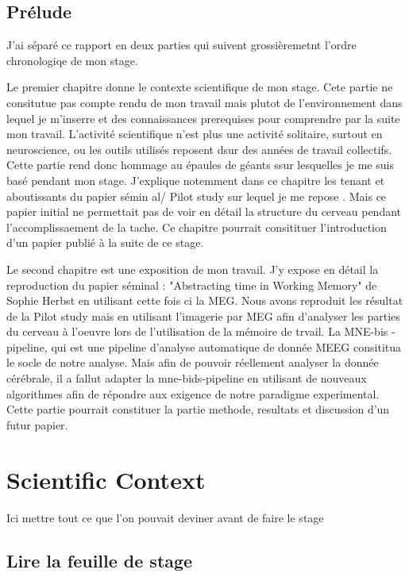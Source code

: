 \section{Prélude}

J'ai séparé ce rapport en deux parties qui suivent grossièremetnt l'ordre chronologiqe de mon stage.

Le premier chapitre donne le contexte scientifique de mon stage. Cete partie ne consitutue pas compte rendu de mon travail mais plutot de l'environnement dans lequel je m'inserre et des connaissances prerequises pour comprendre par la suite mon travail. L'activité scientifique n'est plus une activité solitaire, surtout en neuroscience, ou les outils utilisés reposent dsur des années de travail collectifs. Cette partie rend donc hommage au épaules de géants ssur lesquelles je me suis basé pendant mon stage. J'explique notemment dans ce chapitre les tenant et aboutissants du papier sémin al/ Pilot study sur lequel je me repose \cite{herbst2021abstracting}. Mais ce papier initial ne permettait pas de voir en détail la structure du cerveau pendant l'accomplissaement de la tache. Ce chapitre pourrait consitituer l'introduction d'un papier publié à la suite de ce stage.

Le second chapitre est une exposition de mon travail. J'y expose en détail la reproduction du papier séminal : "Abstracting time in Working Memory" de Sophie Herbst en utilisant cette fois ci la MEG. Nous avons reproduit les résultat de la Pilot study mais en utilisant l'imagerie par MEG afin d'analyser les parties du cerveau à l'oeuvre lors de l'utilisation de la mémoire de trvail. La MNE-bis -pipeline, qui est une pipeline d'analyse automatique de donnée MEEG consititua le socle de notre analyse. Mais afin de pouvoir réellement analyser la donnée cérébrale, il a fallut adapter la mne-bids-pipeline en utilisant de nouveaux algorithmes afin de répondre aux exigence de notre paradigme experimental. Cette partie pourrait constituer la partie methode, resultats et discussion d'un futur papier.


\chapter{Scientific Context}
Ici mettre tout ce que l'on pouvait deviner avant de faire le stage

\section{Lire la feuille de stage}

